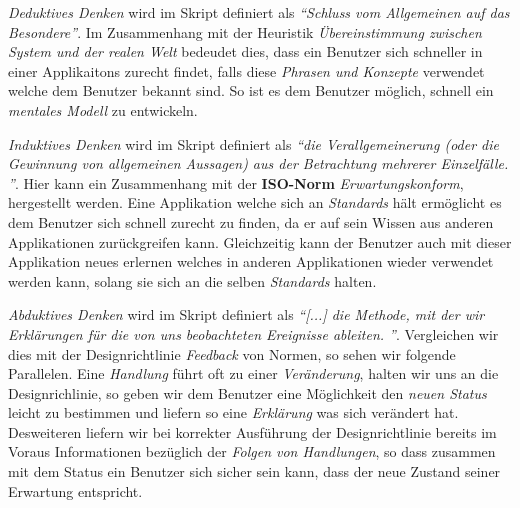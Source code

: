\textit{Deduktives Denken} wird im Skript definiert als \textit{``Schluss vom
Allgemeinen auf das Besondere''}. Im Zusammenhang mit der Heuristik
\textit{Übereinstimmung zwischen System und der realen Welt} bedeudet dies, dass
ein Benutzer sich schneller in einer Applikaitons zurecht findet, falls diese
\textit{Phrasen und Konzepte} verwendet welche dem Benutzer bekannt sind. So ist
es dem Benutzer möglich, schnell ein \textit{mentales Modell} zu entwickeln. 
\newline

\textit{Induktives Denken} wird im Skript definiert als \textit{``die
Verallgemeinerung (oder die Gewinnung von allgemeinen Aussagen) aus der
Betrachtung mehrerer Einzelfälle. ''}. Hier kann ein Zusammenhang mit
der \textbf{ISO-Norm} \textit{Erwartungskonform}, hergestellt werden. Eine
Applikation welche sich an \textit{Standards} hält ermöglicht es dem Benutzer
sich schnell zurecht zu finden, da er auf sein Wissen aus anderen Applikationen
zurückgreifen kann. Gleichzeitig kann der Benutzer auch mit dieser Applikation
neues erlernen welches in anderen Applikationen wieder verwendet werden kann,
solang sie sich an die selben \textit{Standards} halten.

\textit{Abduktives Denken} wird im Skript definiert als \textit{``[...] die
Methode, mit der wir Erklärungen für die von uns beobachteten Ereignisse
ableiten. ''}. Vergleichen wir dies mit der Designrichtlinie \textit{Feedback}
von Normen, so sehen wir folgende Parallelen. Eine \textit{Handlung} führt oft zu einer
\textit{Veränderung}, halten wir uns an die Designrichlinie, so geben wir dem Benutzer
eine Möglichkeit den \textit{neuen Status} leicht zu bestimmen und liefern so
eine \textit{Erklärung} was sich verändert hat. Desweiteren liefern wir bei
korrekter Ausführung der Designrichtlinie bereits im Voraus Informationen
bezüglich der \textit{Folgen von Handlungen}, so dass zusammen mit dem Status ein
Benutzer sich sicher sein kann, dass der neue Zustand seiner Erwartung entspricht. 
 
